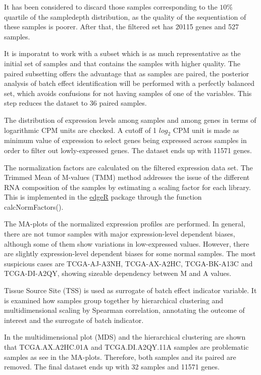\documentclass[9pt,twocolumn,twoside]{gsajnl}
\begin{document}
It has been considered to discard those samples corresponding to the $ 10\% $ quartile of the sampledepth distribution, as the quality of the sequentiation of these samples is poorer. After that, the filtered set has 20115 genes and 527 samples.

It is imporatnt to work with a subset which is as much representative as the initial set of samples and that contains the samples with higher quality. The paired subsetting offers the advantage that as samples are paired, the posterior analysis of batch effect identification will be performed with a perfectly balanced set, which avoids confusions for not having samples of one of the variables. This step reduces the dataset to 36 paired samples.

The distribution of expression levels among samples and among genes in terms of logarithmic CPM units are checked. A cutoff of 1 $log_{2}$ CPM unit is made as minimum value of expression to select genes being expressed across samples in order to filter out lowly-expressed genes. The dataset ends up with 11571 genes.

The normalization factors are calculated on the filtered expression data set. The Trimmed Mean of M-values (TMM) method addresses the issue of the different RNA composition of the samples by estimating a scaling factor for each library. This is implemented in the \href{http://bioconductor.org/packages/release/bioc/html/edgeR.html}{edgeR} package through the function calcNormFactors().

The MA-plots of the normalized expression profiles are performed. In general, there are not tumor samples with major expression-level dependent biases, although some of them show variations in low-expressed values. However, there are slightly expression-level dependent biases for some normal samples. The most suspicious cases are TCGA-AJ-A3NH, TCGA-AX-A2HC, TCGA-BK-A13C and TCGA-DI-A2QY, showing sizeable dependency between M and A values. 

Tissue Source Site (TSS) is used as surrogate of batch effect indicator variable. It is examined how samples group together by hierarchical clustering and multidimensional scaling by Spearman correlation, annotating the outcome of interest and the surrogate of batch indicator.

In the multidimensional plot (MDS) and the hierarchical clustering are shown that TCGA.AX.A2HC.01A and TCGA.DI.A2QY.11A samples are problematic samples as see in the MA-plots. Therefore, both samples and its paired are removed. The final dataset ends up with 32 samples and 11571 genes.
\end{document}
